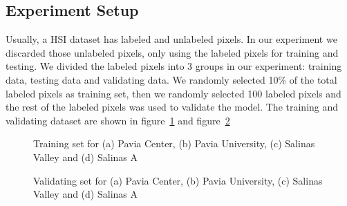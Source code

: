 \documentclass{article}
\begin{document}
	\subsection{Experiment Setup}Usually, a HSI dataset has labeled and unlabeled pixels.
	In our experiment we discarded those unlabeled pixels, only using the labeled pixels for training and testing.
	We divided the labeled pixels into 3 groups in our experiment: training data, testing data and validating data.
	We randomly selected 10\% of the total labeled pixels as training set, then we randomly selected 100 labeled pixels
	and the rest of the labeled pixels was used to validate the model.
	The training and validating dataset are shown in figure~\ref{trainMaps} and figure~\ref{testMaps}

	\begin{figure}
		\begin{subfigure}
			\texttt{[image: pic/p5/pc/1/img/trainMap.eps]}
			\caption{}
		\end{subfigure}
		\begin{subfigure}
			\texttt{[image: pic/p5/pu/1/img/trainMap.eps]}
			\caption{}
		\end{subfigure}
		\begin{subfigure}
			\texttt{[image: pic/p5/sl/1/img/trainMap.eps]}
			\caption{}
		\end{subfigure}
		\begin{subfigure}
			\texttt{[image: pic/p5/sa/1/img/trainMap.eps]}
			\caption{}
		\end{subfigure}
		\caption{Training set for (a) Pavia Center, (b) Pavia University, (c) Salinas Valley and (d) Salinas A}
		\label{trainMaps}
	\end{figure}

	\begin{figure}
		\begin{subfigure}
			\texttt{[image: pic/p5/pc/1/img/testMap.eps]}
			\caption{}
		\end{subfigure}
		\begin{subfigure}
			\texttt{[image: pic/p5/pu/1/img/testMap.eps]}
			\caption{}
		\end{subfigure}
		\begin{subfigure}
			\texttt{[image: pic/p5/sl/1/img/testMap.eps]}
			\caption{}
		\end{subfigure}
		\begin{subfigure}
			\texttt{[image: pic/p5/sa/1/img/testMap.eps]}
			\caption{}
		\end{subfigure}
		\caption{Validating set for (a) Pavia Center, (b) Pavia University, (c) Salinas Valley and (d) Salinas A}
		\label{testMaps}
	\end{figure}
\end{document}
